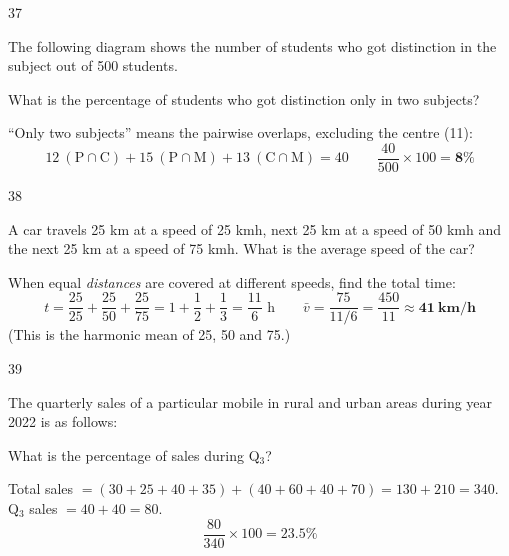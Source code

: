 \begin{question}{37}
{The following diagram shows the number of students who got distinction in the subject out of 500 students.\par}
What is the percentage of students who got distinction only in two subjects?
\begin{explain}
``Only two subjects'' means the pairwise overlaps, excluding the centre (11):
\[12\ (\text{P}\cap\text{C})+15\ (\text{P}\cap\text{M})+13\ (\text{C}\cap\text{M})=40\qquad\frac{40}{500}\times100=\mathbf{8\%}\]
\end{explain}
\end{question}

\begin{question}{38}
{A car travels 25 km at a speed of 25 kmh, next 25 km at a speed of 50 kmh and the next 25 km at a speed of 75 kmh. What is the average speed of the car?\par}
\begin{explain}
When equal \emph{distances} are covered at different speeds, find the total time:
\[t=\frac{25}{25}+\frac{25}{50}+\frac{25}{75}=1+\frac12+\frac13=\frac{11}{6}\text{ h}\qquad \bar v=\frac{75}{11/6}=\frac{450}{11}\approx\mathbf{41\ km/h}\]
(This is the harmonic mean of 25, 50 and 75.)
\end{explain}
\end{question}

\begin{question}{39}
{The quarterly sales of a particular mobile in rural and urban areas during year 2022 is as follows:\par}
What is the percentage of sales during Q$_3$?
\begin{explain}
Total sales $=(30+25+40+35)+(40+60+40+70)=130+210=340$.\\
Q$_3$ sales $=40+40=80$.
\[\frac{80}{340}\times100=\mathbf{23.5\%}\]
\end{explain}
\end{question}

